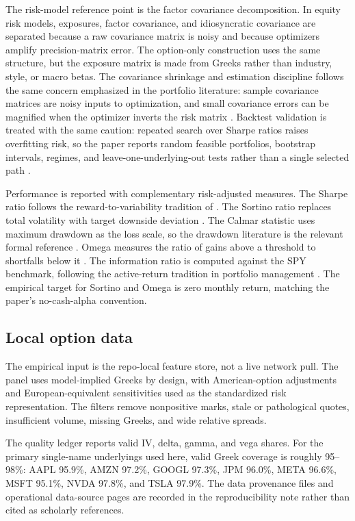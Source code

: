 The risk-model reference point is the factor covariance decomposition. In equity risk
models, exposures, factor covariance, and idiosyncratic covariance are separated because a
raw covariance matrix is noisy and because optimizers amplify precision-matrix error. The
option-only construction uses the same structure, but the exposure matrix is made from
Greeks rather than industry, style, or macro betas. The covariance shrinkage and
estimation discipline follows the same concern emphasized in the portfolio literature:
sample covariance matrices are noisy inputs to optimization, and small covariance errors
can be magnified when the optimizer inverts the risk matrix \citep{ledoitwolf2004}.
Backtest validation is treated with the same caution: repeated search over Sharpe ratios
raises overfitting risk, so the paper reports random feasible portfolios, bootstrap
intervals, regimes, and leave-one-underlying-out tests rather than a single selected path
\citep{bailey2017pbo,lopezdeprado2018}.

Performance is reported with complementary risk-adjusted measures.  The Sharpe ratio
follows the reward-to-variability tradition of \citet{sharpe1966}.  The Sortino ratio
replaces total volatility with target downside deviation \citep{sortino_price1994}.  The
Calmar statistic uses maximum drawdown as the loss scale, so the drawdown literature is
the relevant formal reference \citep{magdon_ismail_atiya2004}.  Omega measures the ratio
of gains above a threshold to shortfalls below it \citep{keating_shadwick2002}.  The
information ratio is computed against the SPY benchmark, following the active-return
tradition in portfolio management \citep{grinold_kahn2000}.  The empirical target for
Sortino and Omega is zero monthly return, matching the paper's no-cash-alpha convention.

\subsection{Local option data}

The empirical input is the repo-local feature store, not a live network pull. The panel
uses model-implied Greeks by design, with American-option adjustments and
European-equivalent sensitivities used as the standardized risk representation. The
filters remove nonpositive marks, stale or pathological quotes, insufficient volume,
missing Greeks, and wide relative spreads.

The quality ledger reports valid IV, delta, gamma, and vega shares. For the primary
single-name underlyings used here, valid Greek coverage is roughly 95--98\%: AAPL 95.9\%,
AMZN 97.2\%, GOOGL 97.3\%, JPM 96.0\%, META 96.6\%, MSFT 95.1\%, NVDA 97.8\%, and TSLA
97.9\%. The data provenance files and operational data-source pages are recorded in the
reproducibility note rather than cited as scholarly references.

\begin{table}[H]
\centering
\resizebox{\textwidth}{!}{}
\caption{Empirical data summary. The raw row count is after the paper's liquidity,
moneyness, and Greek-validity filters.}
\label{tab:data}
\end{table}
